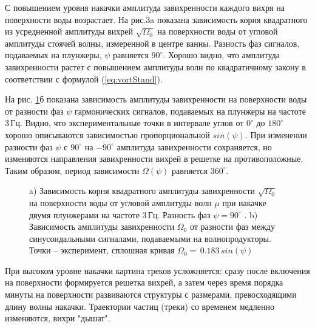 С повышением уровня накачки амплитуда завихренности каждого вихря на поверхности воды возрастает. На рис.3a показана зависимость корня квадратного из усредненной амплитуды вихрей $\sqrt{\Omega_0}$ на поверхности воды от угловой амплитуды стоячей волны, измеренной в центре ванны. Разность фаз сигналов, подаваемых на плунжеры, $\psi$ равняется $90^\circ$. Хорошо видно, что амплитуда завихренности растет с повышением амплитуды волн по квадратичному закону в соответствии с формулой (\ref{eq:vortStand}). 

На рис. \ref{img:ampl_phase}б показана зависимость амплитуды завихренности на поверхности воды от разности фаз $\psi$ гармонических сигналов, подаваемых на плунжеры на частоте 3\,Гц. Видно, что экспериментальные точки в интервале углов от $0^\circ$ до $180^\circ$ хорошо описываются зависимостью пропорциональной $sin(\psi)$. При изменении разности фаз $\psi$ с $90^\circ$ на $-90^\circ$ амплитуда завихренности сохраняется, но изменяются направления завихренности вихрей в решетке на противоположные. Таким образом, период зависимости $\Omega (\psi)$ равняется $360^\circ$. 

\begin{figure}[ht]
  \begin{minipage}[ht]{0.49\linewidth}
  \end{minipage}
  \hfill
  \begin{minipage}[ht]{0.49\linewidth}
  \end{minipage}
  \caption{a) Зависимость корня квадратного амплитуды завихренности $\sqrt{\Omega_0}$ на поверхности воды от угловой амплитуды волн $\mu$ при накачке двумя плунжерами на частоте 3\,Гц. Разность фаз $\psi=90^\circ$ . b) Зависимость амплитуды завихренности $\Omega_0$ от разности фаз между синусоидальными сигналами, подаваемыми на волнопродукторы. Точки – эксперимент, сплошная кривая $\Omega_0 = \,0.183\, sin(\psi)$}
  \label{img:ampl_phase}  
\end{figure}


При высоком уровне накачки картина треков усложняется: сразу после включения на поверхности формируется решетка вихрей, а затем через время порядка минуты на поверхности развиваются структуры с размерами, превосходящими длину волны накачки. Траектории частиц (треки) со временем медленно изменяются, вихри "дышат". 

